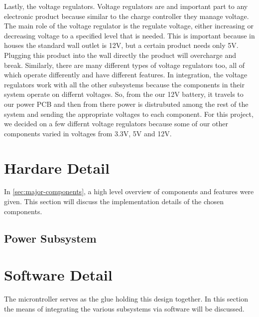 \documentclass[journal]{IEEEtran}
\begin{document}
Lastly, the voltage regulators. Voltage regulators are and important part to any electronic product because 
similar to the charge controller they manage voltage. The main role of the voltage regulator is the regulate 
voltage, either increasing or decreasing voltage to a specified level that is needed. This is important 
because in houses the standard wall outlet is 12V, but a certain product needs only 5V. Plugging this product 
into the wall directly the product will overcharge and break. Similarly, there are many different types of 
voltage regulators too, all of which operate differently and have different features. In integration, the 
voltage regulators work with all the other subsystems because the components in their system operate on 
differnt voltages. So, from the our 12V battery, it travels to our power PCB and then from there power is 
distrubuted among the rest of the system and sending the appropriate voltages to each component. For this 
project, we decided on a few differnt voltage regulators because some of our other components varied in 
voltages from 3.3V, 5V and 12V. 

\section{Hardare Detail}
In \autoref{sec:major-components}, a high level overview of components and features were given. This
section will discuss the implementation details of the chosen components.
\subsection{Power Subsystem} \label{sec:power subsystem}

\section{Software Detail}
The microntroller serves as the glue holding this design together. In this section the means of
integrating the various subsystems via software will be discussed.
\end{document}
